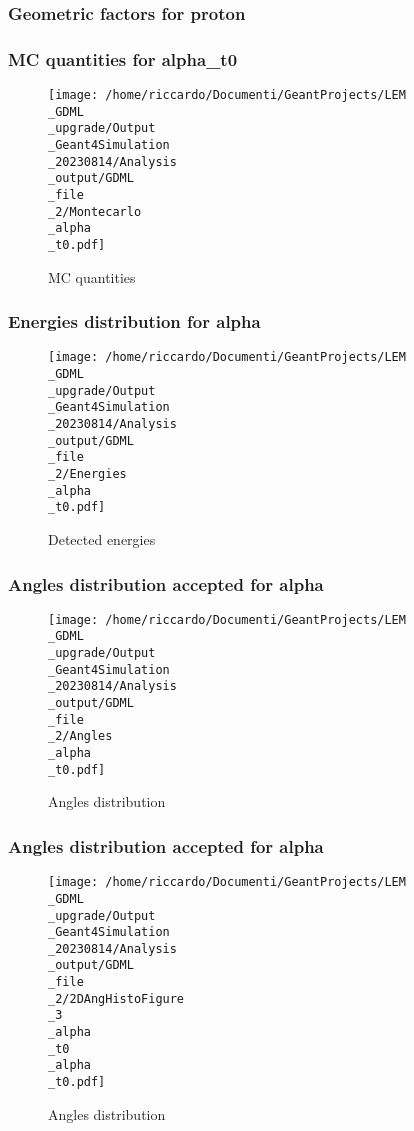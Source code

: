\documentclass[8pt]{beamer}
\begin{document}
            \begin{frame}
                \frametitle{Geometric factors for proton}
            
            \end{frame}
            
            \begin{frame}
                \frametitle{MC quantities for alpha\_t0}
            
        \begin{figure}[h]
            \centering
            \texttt{[image: /home/riccardo/Documenti/GeantProjects/LEM\\\_GDML\\\_upgrade/Output\\\_Geant4Simulation\\\_20230814/Analysis\\\_output/GDML\\\_file\\\_2/Montecarlo\\\_alpha\\\_t0.pdf]}
            \caption{MC quantities}
        \end{figure}
        
            \end{frame}
            
            \begin{frame}
                \frametitle{Energies distribution for alpha}
            
        \begin{figure}[h]
            \centering
            \texttt{[image: /home/riccardo/Documenti/GeantProjects/LEM\\\_GDML\\\_upgrade/Output\\\_Geant4Simulation\\\_20230814/Analysis\\\_output/GDML\\\_file\\\_2/Energies\\\_alpha\\\_t0.pdf]}
            \caption{Detected energies}
        \end{figure}
        
            \end{frame}
            
            \begin{frame}
                \frametitle{Angles distribution accepted for alpha}
            
        \begin{figure}[h]
            \centering
            \texttt{[image: /home/riccardo/Documenti/GeantProjects/LEM\\\_GDML\\\_upgrade/Output\\\_Geant4Simulation\\\_20230814/Analysis\\\_output/GDML\\\_file\\\_2/Angles\\\_alpha\\\_t0.pdf]}
            \caption{Angles distribution}
        \end{figure}
        
            \end{frame}
            
            \begin{frame}
                \frametitle{Angles distribution accepted for alpha}
            
        \begin{figure}[h]
            \centering
            \texttt{[image: /home/riccardo/Documenti/GeantProjects/LEM\\\_GDML\\\_upgrade/Output\\\_Geant4Simulation\\\_20230814/Analysis\\\_output/GDML\\\_file\\\_2/2DAngHistoFigure\\\_3\\\_alpha\\\_t0\\\_alpha\\\_t0.pdf]}
            \caption{Angles distribution}
        \end{figure}
        
            \end{frame}
            
\end{document}
